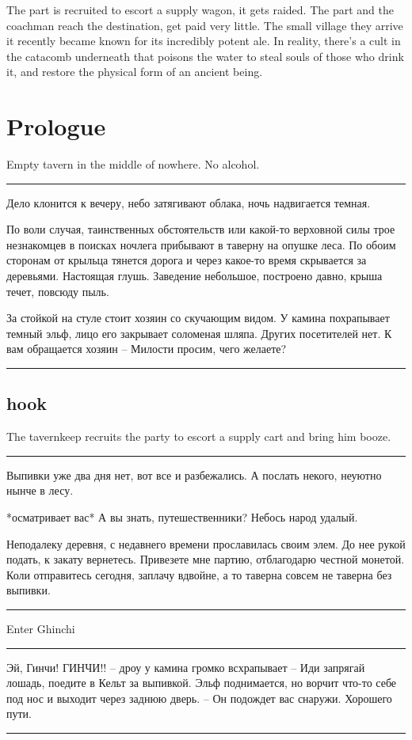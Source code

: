 \documentclass[a5paper,11pt]{book}
\newenvironment{boxed}
{\em\noindent\rule[1ex]{\linewidth}{0.1pt}\linebreak\indent}
{\par\noindent\rule[1ex]{\linewidth}{0.1pt}}
\begin{document}
\begin{multicols}{2}
The part is recruited to escort a supply wagon, it gets raided. The part and the coachman reach the destination, get paid very little. The small village they arrive it recently became known for its incredibly potent ale. In reality, there's a cult in the catacomb underneath that poisons the water to steal souls of those who drink it, and restore the physical form of an ancient being.

\section{Prologue}
Empty tavern in the middle of nowhere. No alcohol.

\begin{boxed}
Дело клонится к вечеру, небо затягивают облака, ночь надвигается темная.

По воли случая, таинственных обстоятельств или какой-то верховной силы трое незнакомцев в поисках ночлега прибывают в таверну на опушке леса. По обоим сторонам от крыльца тянется дорога и через какое-то время скрывается за деревьями. Настоящая глушь. Заведение небольшое, построено давно, крыша течет, повсюду пыль.

За стойкой на стуле стоит хозяин со скучающим видом. У камина похрапывает темный эльф, лицо его закрывает соломеная шляпа. Других посетителей нет. К вам обращается хозяин -- Милости просим, чего желаете?
\end{boxed}

\subsection{hook}
The tavernkeep recruits the party to escort a supply cart and bring him booze.

\begin{boxed}
Выпивки уже два дня нет, вот все и разбежались. А послать некого, неуютно нынче в лесу.

*осматривает вас* А вы знать, путешественники? Небось народ удалый.

Неподалеку деревня, с недавнего времени прославилась своим элем. До нее рукой подать, к закату вернетесь. Привезете мне партию, отблагодарю честной монетой. Коли отправитесь сегодня, заплачу вдвойне, а то таверна совсем не таверна без выпивки.
\end{boxed}

Enter Ghinchi

\begin{boxed}
Эй, Гинчи! ГИНЧИ!! -- дроу у камина громко всхрапывает -- Иди запрягай лошадь, поедите в Кельт за выпивкой. Эльф поднимается, но ворчит что-то себе под нос и выходит через заднюю дверь. -- Он подождет вас снаружи. Хорошего пути.
\end{boxed}


\end{multicols}
\end{document}
